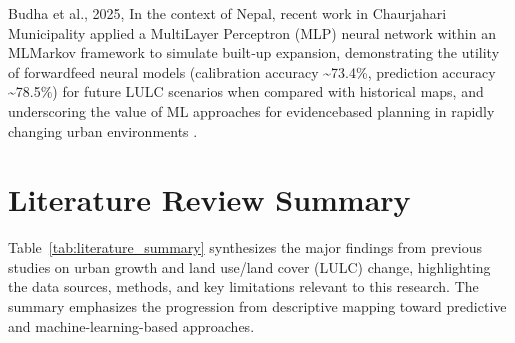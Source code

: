 \documentclass[main]{subfiles}
\begin{document}
Budha et al., 2025, In the context of Nepal, recent work in Chaurjahari Municipality applied a Multi\textminus Layer Perceptron (MLP) neural network within an ML\textminus Markov framework to simulate built‑up expansion, demonstrating the utility of forward\textminus feed neural models (calibration accuracy \textasciitilde 73.4\%, prediction accuracy \textasciitilde 78.5\%) for future LULC scenarios when compared with historical maps, and underscoring the value of ML approaches for evidence\textminus based planning in rapidly changing urban environments \cite{Budha2025}.

\section{Literature Review Summary}

Table~\ref{tab:literature_summary} synthesizes the major findings from previous studies on urban growth and land use/land cover (LULC) change, highlighting the data sources, methods, and key limitations relevant to this research. The summary emphasizes the progression from descriptive mapping toward predictive and machine-learning-based approaches.


\setlength{\tabcolsep}{4pt}
\renewcommand{\arraystretch}{1.2}
\setlength{\LTleft}{0pt}
\setlength{\LTright}{0pt}
\small
\end{document}
